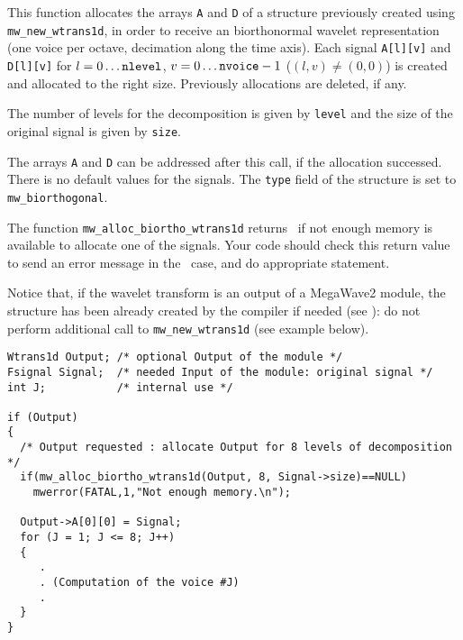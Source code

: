 \Description
This function allocates the arrays \verb+A+ and \verb+D+ of a \wtransud structure previously created using \verb+mw_new_wtrans1d+, in order to receive
an biorthonormal wavelet representation (one voice per octave, decimation along the time axis).
Each signal \verb+A[l][v]+ and \verb+D[l][v]+ for $l=0 \ldots \mbox{{\tt nlevel}}$, $v=0 \ldots \mbox{{\tt nvoice}}-1$ ($(l,v) \not = (0,0)$) is created and
allocated to the right size.
Previously allocations are deleted, if any.

The number of levels for the decomposition is given by \verb+level+ and the
size of the original signal is given by \verb+size+.

The arrays \verb+A+ and \verb+D+ can be addressed after this call, if the allocation successed. There is no default values for the signals.
The \verb+type+ field of the \wtransud structure is set to \verb+mw_biorthogonal+.

The function \verb+mw_alloc_biortho_wtrans1d+ returns \Null\ if not enough memory is available to allocate one of the signals. 
Your code should check this return value to send an error message in the \Null\ case, and do appropriate statement.

Notice that, if the wavelet transform is an output of a MegaWave2 module, the structure has been already created by the compiler if needed (see \volI): do not perform additional call to \verb+mw_new_wtrans1d+ (see example below).

\Next
\Example
\begin{verbatim}
Wtrans1d Output; /* optional Output of the module */
Fsignal Signal;  /* needed Input of the module: original signal */
int J;           /* internal use */

if (Output) 
{
  /* Output requested : allocate Output for 8 levels of decomposition */
  if(mw_alloc_biortho_wtrans1d(Output, 8, Signal->size)==NULL)
    mwerror(FATAL,1,"Not enough memory.\n");
  
  Output->A[0][0] = Signal;
  for (J = 1; J <= 8; J++)
  {
     .
     . (Computation of the voice #J)
     .
  }
}
\end{verbatim}

\newpage %


